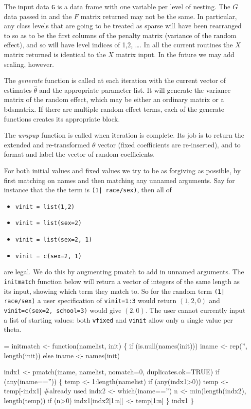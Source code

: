 \documentclass{article}
\begin{document}
The input data \Verb!G! is a data frame with one variable per level of
nesting.  
The $G$ data passed in and the $F$ matrix returned may not be the same.
In particular, any class levels that are going to be treated as
sparse will have been rearranged to so as to be the first columns of
the penalty matrix (variance of the random effect), and so will have
level indices of 1,2, \ldots.
In all the current routines the $X$ matrix returned is
identical to the $X$ matrix input. In the future we may add scaling,
however.

The \emph{generate} function is called at each iteration with the current
vector of estimates $\hat\theta$ and the appropriate parameter list.  
It will generate
the variance matrix of the random effect, which   
may be either an ordinary matrix or a bdsmatrix.
If there are multiple random effect terms, each of the generate
functions creates its appropriate block.

The \emph{wrapup} function is called when iteration is complete.  Its
job is to return the extended and re-transformed $\theta$
vector (fixed coefficients are re-inserted), and to format and label 
the vector of random coefficients.

For both initial values and fixed values we try to be as forgiving
as possible, by first matching on names and then matching any
unnamed arguments.  
Say for instance that the the term is \Verb!(1| race/sex)!, then all of
\begin{itemize}
  \item \Verb!vinit = list(1,2)!
  \item \Verb!vinit = list(sex=2)!
  \item \Verb!vinit = list(sex=2, 1)!
  \item \Verb!vinit = c(sex=2, 1)!
\end{itemize}
are legal.  We do this by augmenting pmatch to add in unnamed arguments.
The \Verb!initmatch! function below will return a vector of 
integers of the same length as its input, showing
which term they match to.
So for the random term \Verb!(1| race/sex)! a user specification of
\Verb!vinit=1:3! would return $(1,2,0)$ and
\Verb!vinit=c(sex=2, school=3)! would give $(2,0)$.
The user cannot currently input a list of starting values: both
\Verb!vfixed! and \Verb?vinit? allow only a single value per theta.
\begin{nwchunk}
=
 initmatch <- function(namelist, init) \{
     if (is.null(names(init))) iname <- rep('', length(init))
     else iname <- names(init)
     
     indx1 <- pmatch(iname, namelist, nomatch=0, duplicates.ok=TRUE)
     if (any(iname=='')) \{
         temp <- 1:length(namelist)
         if (any(indx1>0)) temp <- temp[-indx1]   #already used
         indx2 <- which(iname=='')
         n <- min(length(indx2), length(temp))
         if (n>0) indx1[indx2[1:n]] <- temp[1:n]
         \}
     indx1
     \}
\end{nwchunk}
\end{document}
